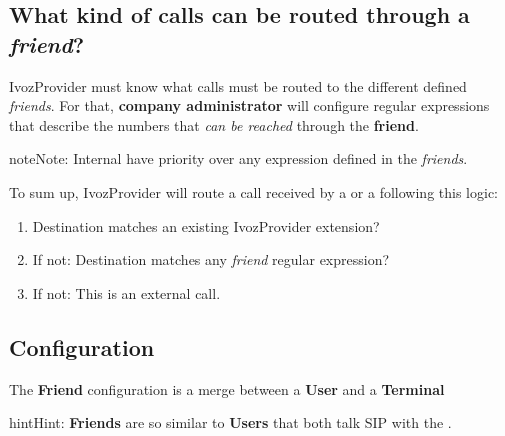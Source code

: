 \documentclass[letterpaper,10pt,english]{sphinxmanual}
\begin{document}
\subsection{What kind of calls can be routed through a \emph{friend}?}
\label{company/friends:what-kind-of-calls-can-be-routed-through-a-friend}
IvozProvider must know what calls must be routed to the different defined \emph{friends}.
For that, \textbf{company administrator} will configure regular expressions that
describe the numbers that \emph{can be reached} through the \textbf{friend}.

\begin{notice}{note}{Note:}
Internal {\hyperref[company/extensions:extensions]{}} have priority over any expression
defined in the \emph{friends}.
\end{notice}

To sum up, IvozProvider will route a call received by a {\hyperref[company/users:users]{}} or
a {\hyperref[company/friends:friends]{}} following this logic:
\begin{enumerate}
\item {} 
Destination matches an existing IvozProvider extension?

\item {} 
If not: Destination matches any \emph{friend} regular expression?

\item {} 
If not: This is an external call.

\end{enumerate}


\subsection{Configuration}
\label{company/friends:configuration}
The \textbf{Friend} configuration is a merge between a \textbf{User} and a \textbf{Terminal}

\begin{notice}{hint}{Hint:}
\textbf{Friends} are so similar to \textbf{Users} that both talk SIP with the
{\hyperref[platform/proxy_users:proxyusers]{}}.
\end{notice}
\end{document}
